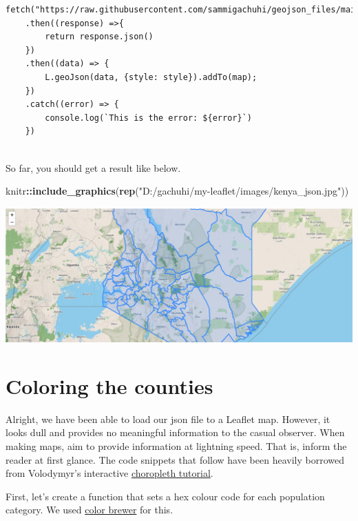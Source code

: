 \documentclass[
]{book}
\newenvironment{Shaded}{\begin{snugshade}}{\end{snugshade}}
\newcommand{\FunctionTok}[1]{\textcolor[rgb]{0.13,0.29,0.53}{\textbf{#1}}}
\newcommand{\NormalTok}[1]{#1}
\newcommand{\SpecialCharTok}[1]{\textcolor[rgb]{0.81,0.36,0.00}{\textbf{#1}}}
\newcommand{\StringTok}[1]{\textcolor[rgb]{0.31,0.60,0.02}{#1}}
\begin{document}
\begin{verbatim}
fetch("https://raw.githubusercontent.com/sammigachuhi/geojson_files/main/counties_json.json")
    .then((response) =>{
        return response.json()
    })
    .then((data) => {
        L.geoJson(data, {style: style}).addTo(map);
    })
    .catch((error) => {
        console.log(`This is the error: ${error}`)
    })
    
\end{verbatim}

So far, you should get a result like below.

\begin{Shaded}
\begin{Highlighting}[]
\NormalTok{knitr}\SpecialCharTok{::}\FunctionTok{include\_graphics}\NormalTok{(}\FunctionTok{rep}\NormalTok{(}\StringTok{"D:/gachuhi/my{-}leaflet/images/kenya\_json.jpg"}\NormalTok{))}
\end{Highlighting}
\end{Shaded}

\includegraphics{../images/kenya_json.jpg}

\hypertarget{coloring-the-counties}{%
\section{Coloring the counties}\label{coloring-the-counties}}

Alright, we have been able to load our json file to a Leaflet map. However, it looks dull and provides no meaningful information to the casual observer. When making maps, aim to provide information at lightning speed. That is, inform the reader at first glance. The code snippets that follow have been heavily borrowed from Volodymyr's interactive \href{https://leafletjs.com/examples/choropleth/}{choropleth tutorial}.

First, let's create a function that sets a hex colour code for each population category. We used \href{https://colorbrewer2.org/\#type=sequential\&scheme=BuGn\&n=3}{color brewer} for this.
\end{document}
